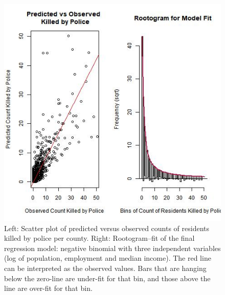 \documentclass[sigconf]{acmart}
\begin{document}
\begin{figure}
\includegraphics[width=1.0\textwidth]{images/figure2.jpg}
\caption{Left: Scatter plot of predicted versus observed counts of residents killed by police per county. Right: Rootogram--fit of the final regression model: negative binomial with three independent variables (log of population, employment and median income).  The red line can be interpreted as the observed values.  Bars that are hanging below the zero-line are under-fit for that bin, and those above the line are over-fit for that bin.}
\end{figure}
\end{document}
